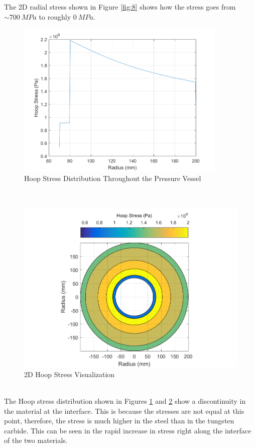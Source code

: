 \documentclass[times]{nmeauth}
\begin{document}
The 2D radial stress shown in Figure \ref{fig:8} shows how the stress goes from $\sim 700~MPa$ to roughly $0~ MPa$. 
\begin{figure}[!htbp]
\centering \includegraphics[width=100mm]{S_thth}
\caption{Hoop Stress Distribution Throughout the Pressure Vessel}\label{fig:9}
\end{figure}\\
\begin{figure}[!htbp]
\centering \includegraphics[width=125mm]{2D_HoopStress}
\caption{2D Hoop Stress Visualization}\label{fig:10}
\end{figure}\\
The Hoop stress distribution shown in Figures \ref{fig:9} and \ref{fig:10} show a discontinuity in the material at the interface. This is because the stresses are not equal at this point, therefore, the stress is much higher in the steel than in the tungsten carbide. This can be seen in the rapid increase in stress right along the interface of the two materials.  
\pagebreak
\vspace{-2pt}
\end{document}
